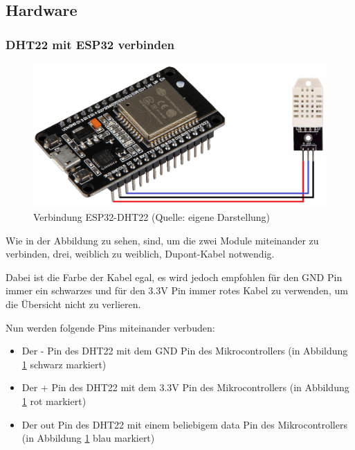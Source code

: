 \subsection{Hardware}

\subsubsection{DHT22 mit ESP32 verbinden}
\begin{figure}[H]
    \begin{center}
        \includegraphics[scale=0.36]{images/DHT22-ESP32-Connection.png}
        \caption{Verbindung ESP32-DHT22 (Quelle: eigene Darstellung)}
        \label{abb:esp32-dht22}
    \end{center}
\end{figure}

Wie in der Abbildung zu sehen, sind, um die zwei Module miteinander zu verbinden, drei, weiblich zu weiblich, Dupont-Kabel notwendig.

Dabei ist die Farbe der Kabel egal, es wird jedoch empfohlen für den GND Pin immer ein schwarzes und für den 3.3V Pin immer rotes Kabel zu verwenden, um die Übersicht nicht zu verlieren.

Nun werden folgende Pins miteinander verbuden:
\begin{itemize}
    \item Der - Pin des DHT22 mit dem GND Pin des Mikrocontrollers (in Abbildung \ref{abb:esp32-dht22} schwarz markiert)
    \item Der + Pin des DHT22 mit dem 3.3V Pin des Mikrocontrollers (in Abbildung \ref{abb:esp32-dht22} rot markiert)
    \item Der out Pin des DHT22 mit einem beliebigem data Pin des Mikrocontrollers (in Abbildung \ref{abb:esp32-dht22} blau markiert)
\end{itemize}
\pagebreak

